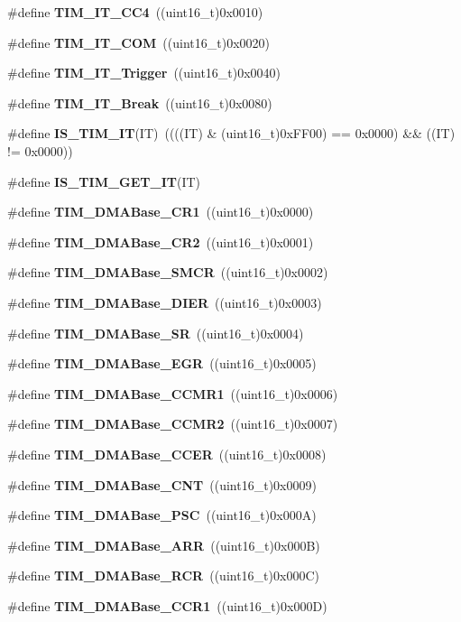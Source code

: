 \begin{DoxyCompactItemize}
\#define \textbf{ T\+I\+M\+\_\+\+I\+T\+\_\+\+C\+C4}~((uint16\+\_\+t)0x0010)
\item 
\#define \textbf{ T\+I\+M\+\_\+\+I\+T\+\_\+\+C\+OM}~((uint16\+\_\+t)0x0020)
\item 
\#define \textbf{ T\+I\+M\+\_\+\+I\+T\+\_\+\+Trigger}~((uint16\+\_\+t)0x0040)
\item 
\#define \textbf{ T\+I\+M\+\_\+\+I\+T\+\_\+\+Break}~((uint16\+\_\+t)0x0080)
\item 
\#define \textbf{ I\+S\+\_\+\+T\+I\+M\+\_\+\+IT}(IT)~((((IT) \& (uint16\+\_\+t)0x\+F\+F00) == 0x0000) \&\& ((\+I\+T) != 0x0000))
\item 
\#define \textbf{ I\+S\+\_\+\+T\+I\+M\+\_\+\+G\+E\+T\+\_\+\+IT}(IT)
\item 
\#define \textbf{ T\+I\+M\+\_\+\+D\+M\+A\+Base\+\_\+\+C\+R1}~((uint16\+\_\+t)0x0000)
\item 
\#define \textbf{ T\+I\+M\+\_\+\+D\+M\+A\+Base\+\_\+\+C\+R2}~((uint16\+\_\+t)0x0001)
\item 
\#define \textbf{ T\+I\+M\+\_\+\+D\+M\+A\+Base\+\_\+\+S\+M\+CR}~((uint16\+\_\+t)0x0002)
\item 
\#define \textbf{ T\+I\+M\+\_\+\+D\+M\+A\+Base\+\_\+\+D\+I\+ER}~((uint16\+\_\+t)0x0003)
\item 
\#define \textbf{ T\+I\+M\+\_\+\+D\+M\+A\+Base\+\_\+\+SR}~((uint16\+\_\+t)0x0004)
\item 
\#define \textbf{ T\+I\+M\+\_\+\+D\+M\+A\+Base\+\_\+\+E\+GR}~((uint16\+\_\+t)0x0005)
\item 
\#define \textbf{ T\+I\+M\+\_\+\+D\+M\+A\+Base\+\_\+\+C\+C\+M\+R1}~((uint16\+\_\+t)0x0006)
\item 
\#define \textbf{ T\+I\+M\+\_\+\+D\+M\+A\+Base\+\_\+\+C\+C\+M\+R2}~((uint16\+\_\+t)0x0007)
\item 
\#define \textbf{ T\+I\+M\+\_\+\+D\+M\+A\+Base\+\_\+\+C\+C\+ER}~((uint16\+\_\+t)0x0008)
\item 
\#define \textbf{ T\+I\+M\+\_\+\+D\+M\+A\+Base\+\_\+\+C\+NT}~((uint16\+\_\+t)0x0009)
\item 
\#define \textbf{ T\+I\+M\+\_\+\+D\+M\+A\+Base\+\_\+\+P\+SC}~((uint16\+\_\+t)0x000\+A)
\item 
\#define \textbf{ T\+I\+M\+\_\+\+D\+M\+A\+Base\+\_\+\+A\+RR}~((uint16\+\_\+t)0x000\+B)
\item 
\#define \textbf{ T\+I\+M\+\_\+\+D\+M\+A\+Base\+\_\+\+R\+CR}~((uint16\+\_\+t)0x000\+C)
\item 
\#define \textbf{ T\+I\+M\+\_\+\+D\+M\+A\+Base\+\_\+\+C\+C\+R1}~((uint16\+\_\+t)0x000\+D)

\end{DoxyCompactItemize}
